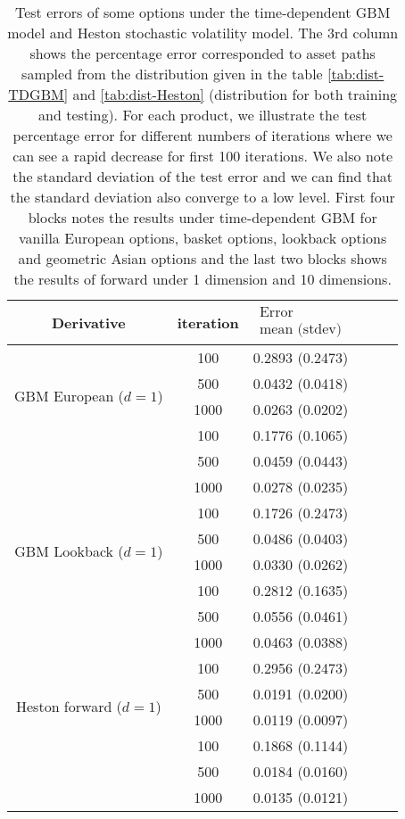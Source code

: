 \documentclass[11pt,a4paper]{article}
\theoremstyle{remark}
\begin{document}
\begin{table}[htbp!]
	\centering
	\begin{tabular}{cccccc}
		\hline Derivative & iteration  & $\begin{array}{c}\text{Error} \\
			\text{mean (stdev)} \end{array}$  \\
		\hline \multirow{4}{*}{GBM European ($d=1$)} & 100 & 0.2893 (0.2473) \\
		& 500  & 0.0432 (0.0418) \\
		& 1000 & 0.0263  (0.0202) \\
		
		\hline \multirow{4}{*}{GBM European ($d=10$)} & 100 & 0.1776 (0.1065) \\
		& 500 & 0.0459 (0.0443) \\
		& 1000  &0.0278 (0.0235) \\
		
		\hline \multirow{4}{*}{GBM Lookback ($d=1$)} & 100 & 0.1726 (0.2473) \\
		& 500   & 0.0486 (0.0403) \\
		& 1000 & 0.0330 (0.0262) \\
		
		\hline \multirow{4}{*}{GBM Geometric Asian ($d=1$)} & 100 & 0.2812 (0.1635) \\
		& 500 & 0.0556 (0.0461) \\
		& 1000  & 0.0463 (0.0388) \\
		
		\hline \multirow{4}{*}{Heston forward ($d=1$)} & 100 & 0.2956 (0.2473) \\
		& 500  & 0.0191 (0.0200) \\
		& 1000 & 0.0119 (0.0097) \\
		\hline \multirow{4}{*}{Heston forward ($d=10$)} & 100  & 0.1868 (0.1144) \\
		& 500 & 0.0184 (0.0160) \\
		& 1000  & 0.0135 (0.0121) \\
		\hline
		
		
	\end{tabular}
	\caption{Test errors of some options under the time-dependent GBM model and Heston stochastic volatility model. The 3rd column shows the percentage error corresponded to asset paths sampled from the distribution given in the table \ref{tab:dist-TDGBM} and \ref{tab:dist-Heston} (distribution for both training and testing). For each product, we illustrate the test percentage error for different numbers of iterations where we can see a rapid decrease for first 100  iterations. We also note the standard deviation of the test error and we can find that the standard deviation also converge to a low level. First four blocks notes the results under time-dependent GBM for vanilla European options, basket options, lookback options and geometric Asian options and the last two blocks shows the results of forward under 1 dimension and 10 dimensions. }
	\label{tab:test-GBM&SV}
\end{table}
\end{document}
